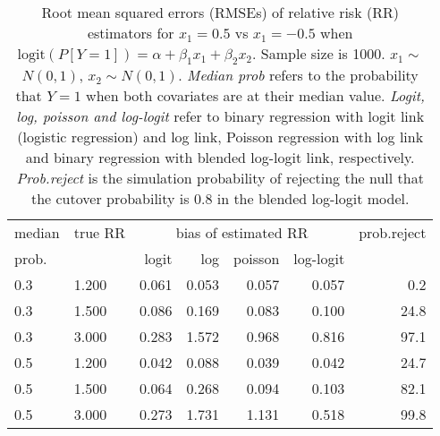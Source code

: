 \documentclass[12pt,a4paper]{article}
\begin{document}
\begin{table}[H] 
\small\sf\centering 
\caption{Root mean squared errors (RMSEs) of relative risk (RR) estimators for $x_1=0.5$ vs $x_1=-0.5$ when $\mbox{logit}(P[Y=1])=\alpha+\beta_1 x_1 + \beta_2 x_2$. Sample size is 1000. $x_1 \sim $$N(0,1)$, $x_2 \sim N(0,1)$. {\it Median prob} refers to the probability that $Y=1$ when both covariates are at their median value. {\it Logit, log, poisson and log-logit} refer to binary regression with logit link (logistic regression) and log link, Poisson regression with log link and binary regression with blended log-logit link, respectively. {\it Prob.reject} is the simulation probability of rejecting the null that the cutover probability is $0.8$ in the blended log-logit model.} 
\begin{tabular}{llrrrrr} 
\toprule 
median & true RR & \multicolumn{4}{c}{bias of estimated RR} & prob.reject \\ 
prob. & & logit & log & poisson & log-logit  & \\ \midrule 
0.3 & 1.200 & 0.061 & 0.053 & 0.057 & 0.057 &  0.2 \\  
0.3 & 1.500 & 0.086 & 0.169 & 0.083 & 0.100 & 24.8 \\  
0.3 & 3.000 & 0.283 & 1.572 & 0.968 & 0.816 & 97.1 \\  
0.5 & 1.200 & 0.042 & 0.088 & 0.039 & 0.042 & 24.7 \\  
0.5 & 1.500 & 0.064 & 0.268 & 0.094 & 0.103 & 82.1 \\  
0.5 & 3.000 & 0.273 & 1.731 & 1.131 & 0.518 & 99.8 \\  
\bottomrule 
\end{tabular} 
\end{table} 
\end{document}
